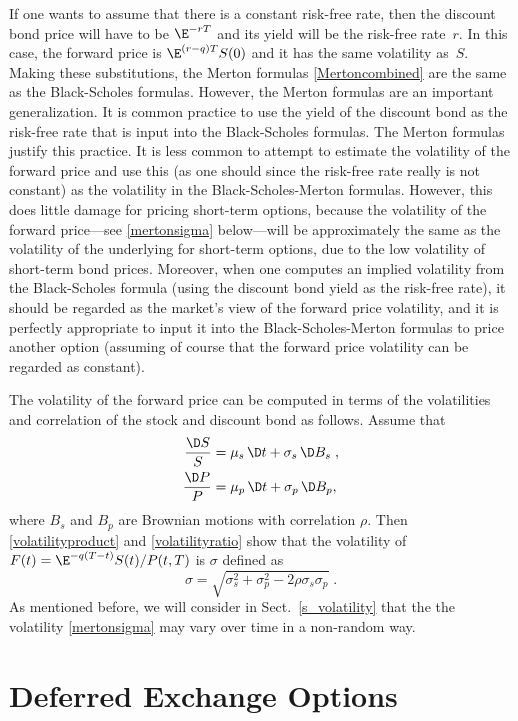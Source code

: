 If one wants to assume that there is a constant risk-free rate, then the discount bond price will have to be $\E^{-rT}$ and its yield will be the risk-free rate~$r$.  In this case, the forward price is $\E^{(r-q)T}S(0)$ and it has the same volatility as~$S$.  Making these substitutions, the Merton formulas \eqref{Mertoncombined} are the same as the Black-Scholes formulas.  However, the Merton formulas are an important generalization.  It is common practice to use the yield of the discount bond as the risk-free rate that is input into the Black-Scholes formulas.  The Merton formulas justify this practice.  It is less common to attempt to estimate the volatility of the forward price and use this (as one should since the risk-free rate really is not constant) as the volatility in the Black-Scholes-Merton formulas.  However, this does little damage for pricing short-term options, because the volatility of the forward price---see \eqref{mertonsigma} below---will be approximately the same as the volatility of the underlying for short-term options, due to the low volatility of short-term bond prices.  Moreover, when one computes an implied volatility from the Black-Scholes formula (using the discount bond yield as the risk-free rate),  it should be regarded as the market's view of the forward price volatility, and it is perfectly appropriate to input it into the Black-Scholes-Merton formulas to price another option (assuming of course that the forward price volatility can be regarded as constant).

The volatility of the forward price can be computed in terms of the  volatilities and correlation of the stock and discount bond as follows.  Assume that 
\begin{align*}
\frac{\D S}{S}& = \mu_s\,\D t + \sigma_s\,\D B_s\; ,\\
\frac{\D P}{P}& = \mu_p\,\D t + \sigma_p\,\D B_p,
\end{align*}
where $B_s$ and $B_p$ are Brownian motions with correlation $\rho$.  Then  \eqref{volatilityproduct} and \eqref{volatilityratio} show that the volatility of $F(t) = \E^{-q(T-t)}S(t)/P(t,T)$ is $\sigma$ defined as 
\begin{equation}\label{mertonsigma}
\sigma = \sqrt{\sigma_s^2+\sigma_p^2 - 2\rho\sigma_s\sigma_p}\;.
\end{equation}
As mentioned before, we will consider in Sect.~\ref{s_volatility} that the the volatility \eqref{mertonsigma} may vary over time in a non-random way.

\section{Deferred Exchange Options}

